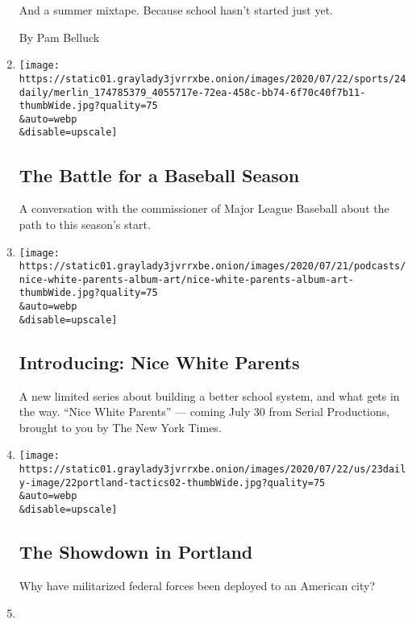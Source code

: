 \begin{enumerate}
  And a summer mixtape. Because school hasn't started just yet.

  By Pam Belluck
\item
  \href{/2020/07/24/podcasts/the-daily/mlb-baseball-season-coronavirus.html}{}

  \texttt{[image: https://static01.graylady3jvrrxbe.onion/images/2020/07/22/sports/24daily/merlin\_174785379\_4055717e-72ea-458c-bb74-6f70c40f7b11-thumbWide.jpg?quality=75\\\&auto=webp\\\&disable=upscale]}

  \hypertarget{the-battle-for-a-baseball-season}{%
  \subsection{The Battle for a Baseball
  Season}\label{the-battle-for-a-baseball-season}}

  A conversation with the commissioner of Major League Baseball about
  the path to this season's start.
\item
  \href{/2020/07/23/podcasts/nice-white-parents-serial.html}{}

  \texttt{[image: https://static01.graylady3jvrrxbe.onion/images/2020/07/21/podcasts/nice-white-parents-album-art/nice-white-parents-album-art-thumbWide.jpg?quality=75\\\&auto=webp\\\&disable=upscale]}

  \hypertarget{introducing-nice-white-parents}{%
  \subsection{Introducing: Nice White
  Parents}\label{introducing-nice-white-parents}}

  A new limited series about building a better school system, and what
  gets in the way. ``Nice White Parents'' --- coming July 30 from Serial
  Productions, brought to you by The New York Times.
\item
  \href{/2020/07/23/podcasts/the-daily/portland-protests.html}{}

  \texttt{[image: https://static01.graylady3jvrrxbe.onion/images/2020/07/22/us/23daily-image/22portland-tactics02-thumbWide.jpg?quality=75\\\&auto=webp\\\&disable=upscale]}

  \hypertarget{the-showdown-in-portland}{%
  \subsection{The Showdown in Portland}\label{the-showdown-in-portland}}

  Why have militarized federal forces been deployed to an American city?
\item
  \href{/2020/07/22/podcasts/the-daily/school-reopenings-coronavirus.html}{}


\end{enumerate}
